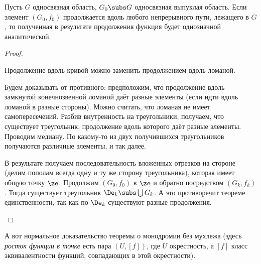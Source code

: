 \documentclass[a4paper]{article}
\begin{document}
\begin{theorem}
\begin{theorem}[О монодромии]
Пусть $G$ односвязная область, $G_0\subs G$ односвязная выпуклая область. Если элемент  $(G_0,f_0)$
продолжается вдоль любого непрерывного пути, лежащего в $G$, то полученная в результате продолжения
функция будет однозначной аналитической.
\end{theorem}
\begin{proof}
\begin{points}{-1}
\item Продолжение вдоль кривой можно заменить продолжением вдоль ломаной.
\item Будем доказывать от противного: предположим,  что продолжение вдоль замкнутой конечнозвенной ломаной
даёт разные элементы (если идти вдоль ломаной в разные стороны). Можно считать, что ломаная не имеет
самопересечений. Разбив внутренность на треугольники, получаем, что существует треугольник,  продолжение
вдоль которого даёт разные элементы. Проводим медиану. По какому-то из двух получившихся треугольников получаются
различные элементы, и так далее.
\item В результате получаем последовательность вложенных отрезков на стороне (делим пополам всегда одну и
ту же сторону треугольника),  которая имеет общую точку $\ze$. Продолжим $(G_0,f_0)$ в $\ze$ и обратно
посредством $(G_k,f_k)$. Тогда существует треугольник $\De_k \subs \bigcup G_k$. А это противоречит
теореме единственности, так как по $\De_k$ существуют разные продолжения.
\end{points}
\hfill\end{proof}

\begin{petit}
А вот нормальное доказательство теоремы о монодромии без мухлежа (здесь \emph{росток функции в точке} есть пара $(U,[f])$,
где $U$ окрестность, а $[f]$ класс эквивалентности функций, совпадающих в этой окрестности).


\end{petit}
\end{theorem}
\end{document}
